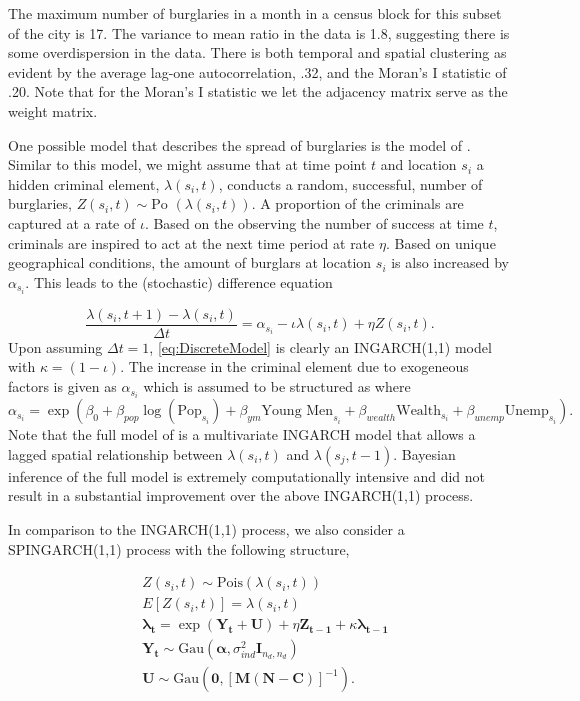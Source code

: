 \documentclass[11pt]{isuthesis}
\begin{document}
The maximum number of burglaries in a month in a census block for this subset of the city is 17.  The variance to mean ratio in the data is 1.8, suggesting there is some overdispersion in the data.  There is both temporal and spatial clustering as evident by the average lag-one autocorrelation, .32, and the Moran's I statistic of .20.  Note that for the Moran's I statistic we let the adjacency matrix serve as the weight matrix.

One possible model that describes the spread of burglaries is the model of \cite{short2008statistical}.  Similar to this model, we might assume that at time point $t$ and location $s_i$ a hidden criminal element, $\lambda(s_i,t)$, conducts a random, successful, number of burglaries, $Z(s_i,t)\sim\mbox{Po }(\lambda(s_i,t))$.  A proportion of the criminals are captured at a rate of $\iota$.  Based on the observing the number of success at time $t$, criminals are inspired to act at the next time period at rate $\eta$.  Based on unique geographical conditions, the amount of burglars at location $s_i$ is also increased by $\alpha_{s_i}$.  This leads to the (stochastic) difference equation

\begin{equation}
	\frac{\lambda(s_i,t+1)-\lambda(s_i,t)}{\Delta t}=\alpha_{s_i}-\iota \lambda(s_i,t)+\eta Z(s_i,t)\label{eq:DiscreteModel}.
\end{equation}
Upon assuming $\Delta t=1$, \eqref{eq:DiscreteModel} is clearly an INGARCH(1,1) model with $\kappa=(1-\iota)$.  The increase in the criminal element due to exogeneous factors is given as $\alpha_{s_i}$ which is assumed to be structured as
where
\begin{equation}
	\alpha_{s_i}=\exp\left(\beta_0+\beta_{pop} \log(\mbox{Pop}_{s_i})+\beta_{ym}\mbox{Young Men}_{s_i}+\beta_{wealth}\mbox{Wealth}_{s_i}+\beta_{unemp}\mbox{Unemp}_{s_i}\right).
\end{equation}
Note that the full model of \cite{short2008statistical} is a multivariate INGARCH model that allows a lagged spatial relationship between $\lambda(s_i,t)$ and $\lambda(s_j,t-1)$.  Bayesian inference of the full \cite{short2008statistical} model is extremely computationally intensive and did not result in a substantial improvement over the above INGARCH(1,1) process.

In comparison to the INGARCH(1,1) process, we also consider a SPINGARCH(1,1) process with the following structure,

\begin{align}
	& Z(s_i,t) \sim \mbox{Pois}(\lambda(s_i,t)) \label{eq:SPINGARCHCHI} \\
	& E[Z(s_i,t)]=\lambda(s_i,t)\\
	& \boldsymbol{\lambda_t} = \exp(\boldsymbol{Y_t}+\boldsymbol{U})+\eta \boldsymbol{Z_{t-1}}+\kappa \boldsymbol{\lambda_{t-1}}\\
	& \boldsymbol{Y_t} \sim \mbox{Gau}\textit{} (\boldsymbol{\alpha},\sigma_{ind}^2 \boldsymbol{I}_{{n_d},{n_d}})\\
	& \boldsymbol{U} \sim \mbox{Gau} (\boldsymbol{0},[\boldsymbol{M}(\boldsymbol{N}-\boldsymbol{C})]^{-1}).
\end{align}
\end{document}
